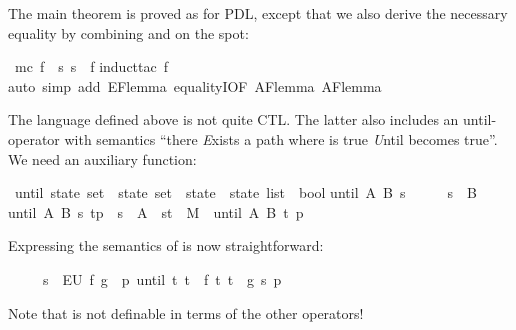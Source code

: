 \begin{isabellebody}
\begin{isamarkuptext}
The main theorem is proved as for PDL, except that we also derive the
necessary equality  by combining
 and  on the spot:%
\end{isamarkuptext}%
\isamarkuptrue%
\ {\isachardoublequote}mc\ f\ {\isacharequal}\ {\isacharbraceleft}s{\isachardot}\ s\ {\isasymTurnstile}\ f{\isacharbraceright}{\isachardoublequote}\isanewline
\isamarkupfalse%
induct{\isacharunderscore}tac\ f{\isacharparenright}\isanewline
\isamarkupfalse%
auto\ simp\ add{\isacharcolon}\ EF{\isacharunderscore}lemma\ equalityI{\isacharbrackleft}OF\ AF{\isacharunderscore}lemma{}\ AF{\isacharunderscore}lemma{}{\isacharbrackright}{\isacharparenright}\isanewline
\isamarkupfalse%
\isamarkupfalse%
%
\begin{isamarkuptext}%
The language defined above is not quite CTL\@. The latter also includes an
until-operator  with semantics ``there \emph{E}xists a path
where  is true \emph{U}ntil  becomes true''.  We need
an auxiliary function:%
\end{isamarkuptext}%
\isamarkuptrue%
\ until{\isacharcolon}{\isacharcolon}\ {\isachardoublequote}state\ set\ {\isasymRightarrow}\ state\ set\ {\isasymRightarrow}\ state\ {\isasymRightarrow}\ state\ list\ {\isasymRightarrow}\ bool{\isachardoublequote}\isanewline
\isamarkupfalse%
\isanewline
{\isachardoublequote}until\ A\ B\ s\ {\isacharbrackleft}{\isacharbrackright}\ \ \ \ {\isacharequal}\ {\isacharparenleft}s\ {\isasymin}\ B{\isacharparenright}{\isachardoublequote}\isanewline
{\isachardoublequote}until\ A\ B\ s\ {\isacharparenleft}t{\isacharhash}p{\isacharparenright}\ {\isacharequal}\ {\isacharparenleft}s\ {\isasymin}\ A\ {\isasymand}\ {\isacharparenleft}s{\isacharcomma}t{\isacharparenright}\ {\isasymin}\ M\ {\isasymand}\ until\ A\ B\ t\ p{\isacharparenright}{\isachardoublequote}\isamarkupfalse%
\isamarkupfalse%
%
\begin{isamarkuptext}%
\noindent
Expressing the semantics of  is now straightforward:
\begin{isabelle}%
\ \ \ \ \ s\ {\isasymTurnstile}\ EU\ f\ g\ {\isacharequal}\ {\isacharparenleft}{\isasymexists}p{\isachardot}\ until\ {\isacharbraceleft}t{\isachardot}\ t\ {\isasymTurnstile}\ f{\isacharbraceright}\ {\isacharbraceleft}t{\isachardot}\ t\ {\isasymTurnstile}\ g{\isacharbraceright}\ s\ p{\isacharparenright}%
\end{isabelle}
Note that  is not definable in terms of the other operators!


\end{isamarkuptext}
\end{isabellebody}
